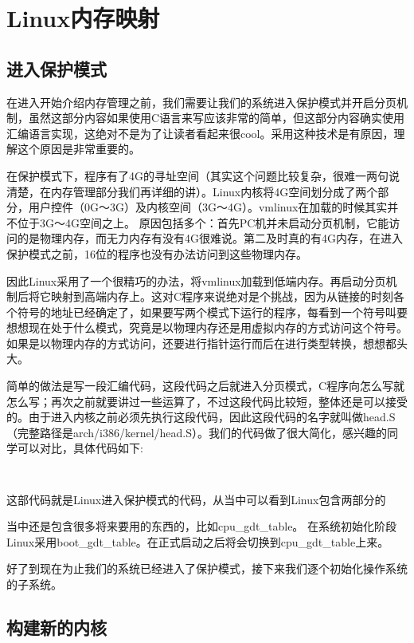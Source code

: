 

\chapter{Linux内存映射}

\section{进入保护模式}
在进入开始介绍内存管理之前，我们需要让我们的系统进入保护模式并开启分页机制，虽然这部分内容如果使用C语言来写应该非常的简单，但这部分内容确实使用汇编语言实现，这绝对不是为了让读者看起来很cool。采用这种技术是有原因，理解这个原因是非常重要的。

在保护模式下，程序有了4G的寻址空间（其实这个问题比较复杂，很难一两句说清楚，在内存管理部分我们再详细的讲）。Linux内核将4G空间划分成了两个部分，用户控件（0G～3G）及内核空间（3G～4G）。vmlinux在加载的时候其实并不位于3G～4G空间之上。
原因包括多个：首先PC机并未启动分页机制，它能访问的是物理内存，而无力内存有没有4G很难说。第二及时真的有4G内存，在进入保护模式之前，16位的程序也没有办法访问到这些物理内存。

因此Linux采用了一个很精巧的办法，将vmlinux加载到低端内存。再启动分页机制后将它映射到高端内存上。这对C程序来说绝对是个挑战，因为从链接的时刻各个符号的地址已经确定了，如果要写两个模式下运行的程序，每看到一个符号叫要想想现在处于什么模式，究竟是以物理内存还是用虚拟内存的方式访问这个符号。如果是以物理内存的方式访问，还要进行指针运行而后在进行类型转换，想想都头大。

简单的做法是写一段汇编代码，这段代码之后就进入分页模式，C程序向怎么写就怎么写；再次之前就要讲过一些运算了，不过这段代码比较短，整体还是可以接受的。由于进入内核之前必须先执行这段代码，因此这段代码的名字就叫做head.S（完整路径是arch/i386/kernel/head.S）。我们的代码做了很大简化，感兴趣的同学可以对比，具体代码如下:
\begin{lstlisting}
	
\end{lstlisting}
这部代码就是Linux进入保护模式的代码，从当中可以看到Linux包含两部分的

当中还是包含很多将来要用的东西的，比如cpu\_gdt\_table。 在系统初始化阶段Linux采用boot\_gdt\_table。在正式启动之后将会切换到cpu\_gdt\_table上来。

好了到现在为止我们的系统已经进入了保护模式，接下来我们逐个初始化操作系统的子系统。


\section{构建新的内核}

